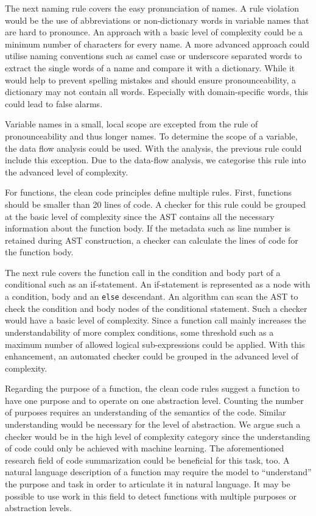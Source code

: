 The next naming rule covers the easy pronunciation of names. A rule violation would be the use of abbreviations or non-dictionary words in variable names that are hard to pronounce. An approach with a basic level of complexity could be a minimum number of characters for every name. A more advanced approach could utilise naming conventions such as camel case or underscore separated words to extract the single words of a name and compare it with a dictionary. While it would help to prevent spelling mistakes and should ensure pronounceability, a dictionary may not contain all words. Especially with domain-specific words, this could lead to false alarms.

Variable names in a small, local scope are excepted from the rule of pronounceability and thus longer names. To determine the scope of a variable, the data flow analysis could be used. With the analysis, the previous rule could include this exception. Due to the data-flow analysis, we categorise this rule into the advanced level of complexity.



For functions, the clean code principles define multiple rules. 
First, functions should be smaller than 20 lines of code. A checker for this rule could be grouped at the basic level of complexity since the AST contains all the necessary information about the function body. If the metadata such as line number is retained during AST construction, a checker can calculate the lines of code for the function body.

The next rule covers the function call in the condition and body part of a conditional such as an if-statement. An if-statement is represented as a node with a condition, body and an \texttt{else} descendant. An algorithm can scan the AST to check the condition and body nodes of the conditional statement. Such a checker would have a basic level of complexity. Since a function call mainly increases the understandability of more complex conditions, some threshold such as a maximum number of allowed logical sub-expressions could be applied. With this enhancement, an automated checker could be grouped in the advanced level of complexity.

Regarding the purpose of a function, the clean code rules suggest a function to have one purpose and to operate on one abstraction level. Counting the number of purposes requires an understanding of the semantics of the code. Similar understanding would be necessary for the level of abstraction. We argue such a checker would be in the high level of complexity category since the understanding of code could only be achieved with machine learning. The aforementioned research field of code summarization could be beneficial for this task, too. A natural language description of a function may require the model to \enquote{understand} the purpose and task in order to articulate it in natural language. It may be possible to use work in this field to detect functions with multiple purposes or abstraction levels.
 
